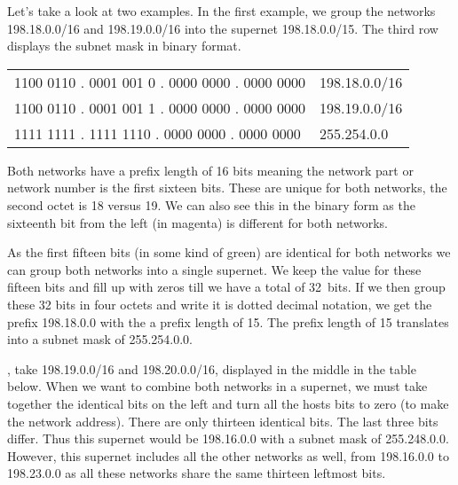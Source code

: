 Let's take a look at two examples.
In the first example, we group the networks 198.18.0.0/16 and 198.19.0.0/16 into the supernet 198.18.0.0/15.
The third row displays the subnet mask in binary format.

\begin{center}
\tosfstyle
\begin{tabular}{@{}l@{\qquad}l@{}}
\color{spot1} 1100 0110 . 0001 001\color{spot2} 0 . 0000 0000 . 0000 0000 & 198.18.0.0/16 \\
\color{spot1} 1100 0110 . 0001 001\color{spot2} 1 . 0000 0000 . 0000 0000 & 198.19.0.0/16 \\
\midrule
\textcolor{spot1}{1111 1111 . 1111 111}0 . 0000 0000 . 0000 0000 & 255.254.0.0 \\
\end{tabular}
\end{center}

Both networks have a prefix length of 16 bits meaning the network part or network number is the first sixteen bits.
These are unique for both networks, the second octet is 18 versus 19.
We can also see this in the binary form as the sixteenth bit from the left (in \textcolor{spot2}{magenta}) is different for both networks.

As the first fifteen bits (in \textcolor{spot1}{some kind of green}) are identical for both networks we can group both networks into a single supernet.
We keep the value for these fifteen bits and fill up with zeros till we have a total of 32~bits.
If we then group these 32 bits in four octets and write it is dotted decimal notation, we get the prefix 198.18.0.0 with the a prefix length of 15.
The prefix length of 15 translates into a subnet mask of 255.254.0.0.

, take 198.19.0.0/16 and 198.20.0.0/16, displayed in the middle in the table below.
When we want to combine both networks in a supernet, we must take together the identical bits on the left and turn all the hosts bits to zero (to make the network address).
There are only thirteen identical bits. The last three bits differ.
Thus this supernet would be 198.16.0.0 with a subnet mask of 255.248.0.0.
However, this supernet includes all the other networks as well, from 198.16.0.0 to 198.23.0.0 as all these networks share the same thirteen leftmost bits.




